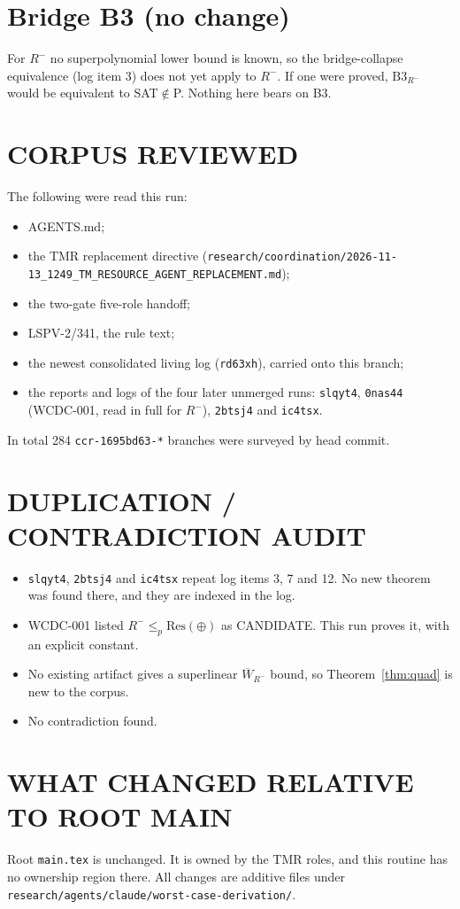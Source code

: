 \documentclass[11pt]{article}
\begin{document}
\section{Bridge B3 (no change)}
For $R^-$ no superpolynomial lower bound is known, so the bridge-collapse equivalence (log item 3) does not yet apply to $R^-$. If one were proved, $\mathrm{B3}_{R^-}$ would be equivalent to SAT$\notin$P. Nothing here bears on B3.

\section{CORPUS REVIEWED}
The following were read this run:
\begin{itemize}
\item AGENTS.md;
\item the TMR replacement directive (\texttt{research/coordination/2026-11-13\_1249\_TM\_RESOURCE\_AGENT\_REPLACEMENT.md});
\item the two-gate five-role handoff;
\item LSPV-2/341, the rule text;
\item the newest consolidated living log (\texttt{rd63xh}), carried onto this branch;
\item the reports and logs of the four later unmerged runs: \texttt{slqyt4}, \texttt{0nas44} (WCDC-001, read in full for $R^-$), \texttt{2btsj4} and \texttt{ic4tsx}.
\end{itemize}
In total 284 \texttt{ccr-1695bd63-*} branches were surveyed by head commit.

\section{DUPLICATION / CONTRADICTION AUDIT}
\begin{itemize}
\item \texttt{slqyt4}, \texttt{2btsj4} and \texttt{ic4tsx} repeat log items 3, 7 and 12. No new theorem was found there, and they are indexed in the log.
\item WCDC-001 listed $R^-\le_p\mathrm{Res}(\oplus)$ as CANDIDATE. This run proves it, with an explicit constant.
\item No existing artifact gives a superlinear $\overline W_{R^-}$ bound, so Theorem~\ref{thm:quad} is new to the corpus.
\item No contradiction found.
\end{itemize}

\section{WHAT CHANGED RELATIVE TO ROOT MAIN}
Root \texttt{main.tex} is unchanged. It is owned by the TMR roles, and this routine has no ownership region there. All changes are additive files under \texttt{research/agents/claude/worst-case-derivation/}.
\end{document}
